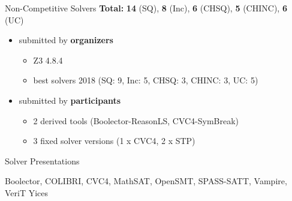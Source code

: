 \documentclass[10pt]{beamer}
\newcommand{\orange}[1]{\textcolor{mLightBrown}{#1}}
\begin{document}
  \begin{frame}{Non-Competitive Solvers}
    \textbf{Total:} \textbf{\orange{14}} (SQ), \textbf{\orange{8}} (Inc),
    \textbf{\orange{6}} (CHSQ),
    \textbf{\orange{5}} (CHINC), \textbf{\orange{6}} (UC)
    \begin{itemize}
      \item submitted by \textbf{organizers}
        \begin{itemize}
          \item Z3 4.8.4
          \item best solvers 2018 (SQ: 9, Inc: 5, CHSQ: 3, CHINC: 3, UC: 5)
        \end{itemize}
      \vspace{1ex}
      \item submitted by \textbf{participants}
        \begin{itemize}
          \item 2 derived tools (Boolector-ReasonLS, CVC4-SymBreak)
          \item 3 fixed solver versions (1 x CVC4, 2 x STP)
        \end{itemize}
    \end{itemize}
  \end{frame}

\begin{frame}{Solver Presentations}
  \begin{center}
    Boolector, COLIBRI, CVC4, MathSAT, OpenSMT, SPASS-SATT,
    Vampire,
    VeriT
    Yices
  \end{center}
\end{frame}

{
  
  
  
  
  
  
  
  
  
  
}
\end{document}
